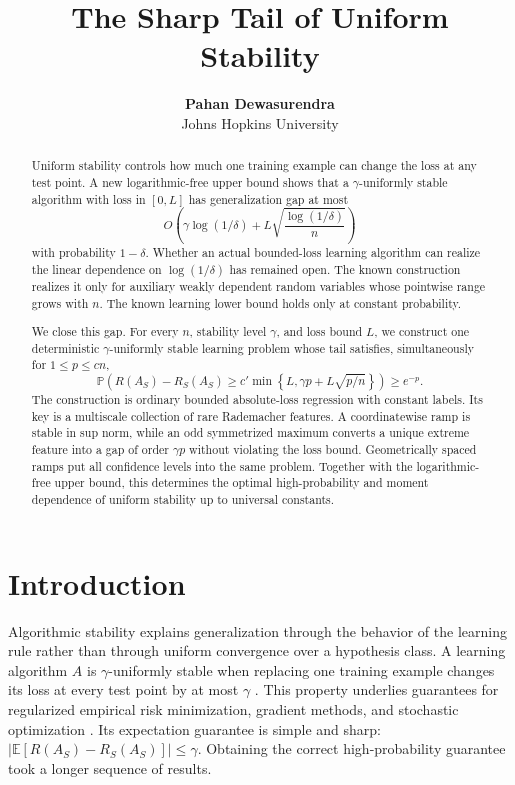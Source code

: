 \documentclass{article}
\title{The Sharp Tail of Uniform Stability}
\author{\textbf{Pahan Dewasurendra} \\ Johns Hopkins University}
\newcommand{\E}{\mathbb E}
\newcommand{\Pp}{\mathbb P}
\newcommand{\1}{\mathbf 1}
\begin{document}
\maketitle

\begin{abstract}
Uniform stability controls how much one training example can change the loss at any test point. A new logarithmic-free upper bound shows that a $\gamma$-uniformly stable algorithm with loss in $[0,L]$ has generalization gap at most \[ O\!\left(\gamma\log(1/\delta) +L\sqrt{\frac{\log(1/\delta)}{n}}\right) \] with probability $1-\delta$. Whether an actual bounded-loss learning algorithm can realize the linear dependence on $\log(1/\delta)$ has remained open. The known construction realizes it only for auxiliary weakly dependent random variables whose pointwise range grows with $n$. The known learning lower bound holds only at constant probability.

We close this gap. For every $n$, stability level $\gamma$, and loss bound $L$, we construct one deterministic $\gamma$-uniformly stable learning problem whose tail satisfies, simultaneously for $1\le p\le c n$, \[ \Pp\!\left( R(A_S)-R_S(A_S) \ge c'\min\!\left\{L,\gamma p+L\sqrt{p/n}\right\} \right)\ge e^{-p}. \] The construction is ordinary bounded absolute-loss regression with constant labels. Its key is a multiscale collection of rare Rademacher features. A coordinatewise ramp is stable in sup norm, while an odd symmetrized maximum converts a unique extreme feature into a gap of order $\gamma p$ without violating the loss bound. Geometrically spaced ramps put all confidence levels into the same problem. Together with the logarithmic-free upper bound, this determines the optimal high-probability and moment dependence of uniform stability up to universal constants.
\end{abstract}

\section{Introduction}

Algorithmic stability explains generalization through the behavior of the learning rule rather than through uniform convergence over a hypothesis class. A learning algorithm $A$ is $\gamma$-uniformly stable when replacing one training example changes its loss at every test point by at most $\gamma$ \citep{bousquet2002}. This property underlies guarantees for regularized empirical risk minimization, gradient methods, and stochastic optimization \citep{shalev2010,hardt2016}. Its expectation guarantee is simple and sharp: $|\E[R(A_S)-R_S(A_S)]|\le\gamma$. Obtaining the correct high-probability guarantee took a longer sequence of results.
\end{document}
